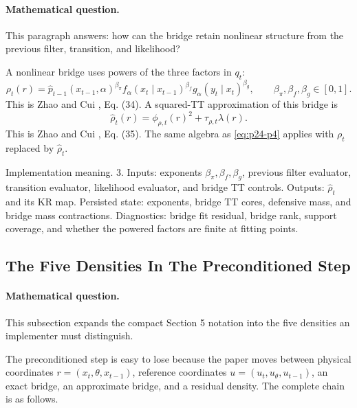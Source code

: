 \documentclass[11pt]{article}
\numberwithin{equation}{section}
\begin{document}
\paragraph{Mathematical question.}
This paragraph answers: how can the bridge retain nonlinear structure from
the previous filter, transition, and likelihood?

A nonlinear bridge uses powers of the three factors in \(q_t\):
\begin{equation}
    \rho_t(r)
    =
    \widehat p_{t-1}(x_{t-1},\alpha)^{\beta_\pi}
    f_\alpha(x_t\mid x_{t-1})^{\beta_f}
    g_\alpha(y_t\mid x_t)^{\beta_g},
    \qquad
    \beta_\pi,\beta_f,\beta_g\in[0,1].
    \label{eq:p24-p6}
\end{equation}
This is Zhao and Cui \cite{zhao2024ttsequential}, Eq. (34).  A squared-TT approximation of this bridge is
\begin{equation}
    \widehat\rho_t(r)
    =
    \phi_{\rho,t}(r)^2+\tau_{\rho,t}\lambda(r).
    \label{eq:p24-p7}
\end{equation}
This is Zhao and Cui \cite{zhao2024ttsequential}, Eq. (35).  The same algebra as \eqref{eq:p24-p4} applies with
\(\rho_t\) replaced by \(\widehat\rho_t\).

Implementation meaning. 3.  Inputs: exponents
\(\beta_\pi,\beta_f,\beta_g\), previous filter evaluator, transition evaluator,
likelihood evaluator, and bridge TT controls.  Outputs: \(\widehat\rho_t\) and
its KR map.  Persisted state: exponents, bridge TT cores, defensive mass, and
bridge mass contractions.  Diagnostics: bridge fit residual, bridge rank,
support coverage, and whether the powered factors are finite at fitting points.

\subsection{The Five Densities In The Preconditioned Step}

\paragraph{Mathematical question.}
This subsection expands the compact Section 5 notation into the five densities
an implementer must distinguish.

The preconditioned step is easy to lose because the paper moves between
physical coordinates \(r=(x_t,\theta,x_{t-1})\), reference coordinates
\(u=(u_t,u_\theta,u_{t-1})\), an exact bridge, an approximate bridge, and a
residual density.  The complete chain is as follows.
\end{document}
